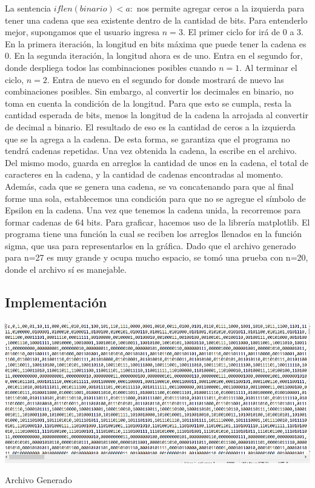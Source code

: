 \documentclass{article}
\begin{document}
La sentencia $if len(binario) < a:$ nos permite agregar ceros a la izquierda para tener una cadena que sea existente dentro de la cantidad de bits. Para entenderlo mejor, supongamos que el usuario ingresa $n = 3$. El primer ciclo for irá de 0 a 3. En la primera iteración, la longitud en bits máxima que puede tener la cadena es 0. En la segunda iteración, la longitud ahora es de uno. Entra en el segundo for, donde despliega todos las combinaciones posibles cuando $n=1$. Al terminar el ciclo, $n=2$. Entra de nuevo en el segundo for donde mostrará de nuevo las combinaciones posibles. Sin embargo, al convertir los decimales en binario, no toma en cuenta la condición de la longitud. Para que esto se cumpla, resta la cantidad esperada de bits, menos la longitud de la cadena la arrojada al convertir de decimal a binario. El resultado de eso es la cantidad de ceros a la izquierda que se la agrega a la cadena. De esta forma, se garantiza que el programa no tendrá cadenas repetidas. Una vez obtenida la cadena, la escribe en el archivo. Del mismo modo, guarda en arreglos la cantidad de unos en la cadena, el total de caracteres en la cadena, y la cantidad de cadenas encontradas al momento. 
Además, cada que se genera una cadena, se va concatenando para que al final forme una sola, establecemos una condición para que no se agregue el símbolo de Epsilon en la cadena. Una vez que tenemos la cadena unida, la recorremos para formar cadenas de 64 bits.
\newline\newline
Para graficar, hacemos uso de la librería matplotlib. El programa tiene una función la cual se reciben los arreglos llenados en la función sigma, que usa para representarlos en la gráfica. 
Dado que el archivo generado para n=27 es muy grande y ocupa mucho espacio, se tomó una prueba con n=20, donde el archivo sí es manejable.

\subsection{Implementación}
\begin{center}
    \includegraphics[scale = 0.7]{universoFile1.PNG}
    \caption{Archivo Generado}
\end{center}
\end{document}
